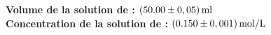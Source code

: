 \documentclass[11pt]{article}
\newcommand{\ml}{\ensuremath{\,\textrm{ml}}}
\newcommand{\M}{\ensuremath{\,\textrm{mol/L}}}
\def\LimitantMasseMontage{90.109}%
\def\LimitantMasseMontageCu{90.212}%
\def\ExcesMasseZn{0.528}%
\def\ExcesMasseMontage{150.639}%
\def\ExcesMasseMontageCu{150.950}%
\def\SolutionVolume{50.00}%
\def\SolutionConcentration{0.150}%
\begin{document}
\begin{center}
\justifying\textbf{Volume de la solution de  :} $(\num\SolutionVolume\pm0,05)\ml$\\
\justifying\textbf{Concentration de la solution de  :} $(\num\SolutionConcentration\pm0,001)\M$
\end{center}
\end{document}
